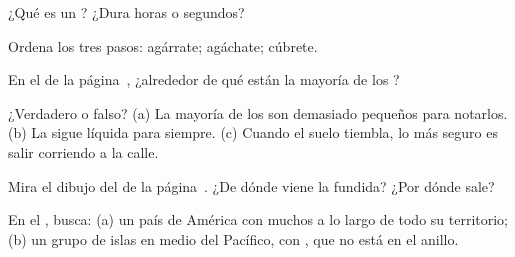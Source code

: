 \begin{exercise}[$\star$]\label{exo:g4:volcanoes-earthquakes-first-look:2}
¿Qué es un ? ¿Dura horas o segundos?
\end{exercise}

\begin{exercise}[$\star$]\label{exo:g4:volcanoes-earthquakes-first-look:3}
Ordena los tres pasos: agárrate; agáchate; cúbrete.
\end{exercise}

\begin{exercise}[$\star$]\label{exo:g4:volcanoes-earthquakes-first-look:4}
En el  de la página~\pageref{fig:g4:volcanoes-earthquakes-first-look:map},
¿alrededor de qué  están la mayoría de los ?
\end{exercise}

\begin{exercise}[$\star$]\label{exo:g4:volcanoes-earthquakes-first-look:5}
¿Verdadero o falso? (a) La mayoría de los  son demasiado pequeños
para notarlos. (b) La  sigue líquida para siempre. (c) Cuando el suelo
tiembla, lo más seguro es salir corriendo a la calle.
\end{exercise}

\begin{exercise}[$\star$]\label{exo:g4:volcanoes-earthquakes-first-look:6}
Mira el dibujo del  de la página~\pageref{fig:g4:volcanoes-earthquakes-first-look:volcano}.
¿De dónde viene la  fundida? ¿Por dónde sale?
\end{exercise}

\begin{exercise}[$\star\star$]\label{exo:g4:volcanoes-earthquakes-first-look:7}
En el , busca: (a) un país de América con muchos  a lo largo de
todo su territorio; (b) un grupo de islas en medio del  Pacífico, con
, que no está en el anillo.
\end{exercise}


